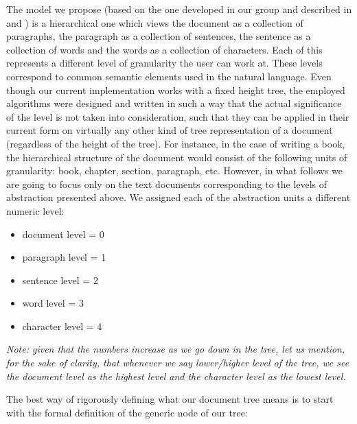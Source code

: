 The model we propose (based on the one developed in our group and described in \cite{ignat02}
and \cite{ignat03}) is a hierarchical one which views the document as a collection
of paragraphs, the paragraph as a collection of sentences, the sentence as a collection
of words and the words as a collection of characters. Each of this represents a different
level of granularity the user can work at. These levels correspond to common semantic
elements used in the natural language. Even though our current implementation works with
a fixed height tree, the employed algorithms were designed and written in such a way that
the actual significance of the level is not taken into consideration, such that they
can be applied in their current form on virtually any other kind of tree representation
of a document (regardless of the height of the tree). For instance, in the case of writing
a book, the hierarchical structure of the document would consist of the following units
of granularity: book, chapter, section, paragraph, etc. However, in what follows we
are going to focus only on the text documents corresponding to the levels of abstraction
presented above. We assigned each of the abstraction units a different numeric level:

\begin{itemize}
\item document level = 0
\item paragraph level = 1
\item sentence level = 2
\item word level = 3
\item character level = 4
\end{itemize}

\emph{Note: given that the numbers increase as we go down in the tree, let us mention,
for the sake of clarity, that whenever we say lower/higher level of the tree, we see
the document level as the highest level and the character level as the lowest level.}

The best way of rigorously defining what our document tree means is to start with
the formal definition of the generic node of our tree:

